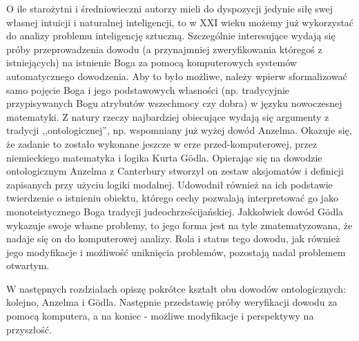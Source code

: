 \documentclass{eiti-raport}
\begin{document}
O ile starożytni i średniowieczni autorzy mieli do dyspozycji jedynie siłę swej własnej intuicji i naturalnej inteligencji, to w XXI wieku możemy już wykorzystać do analizy problemu inteligencję sztuczną. Szczególnie interesujące wydają się próby przeprowadzenia dowodu (a przynajmniej zweryfikowania któregoś z istniejących) na istnienie Boga za pomocą komputerowych systemów automatycznego dowodzenia. Aby to było możliwe, należy wpierw sformalizować samo pojęcie Boga i jego podstawowych własności (np. tradycyjnie przypisywanych Bogu atrybutów wszechmocy czy dobra) w języku nowoczesnej matematyki. Z natury rzeczy najbardziej obiecujące wydają się argumenty z tradycji ,,ontologicznej'', np. wspomniany już wyżej dowód Anzelma. Okazuje się, że zadanie to zostało wykonane jeszcze w erze przed-komputerowej, przez niemieckiego matematyka i logika Kurta G\"odla. Opierając się na dowodzie ontologicznym Anzelma z Canterbury stworzył on zestaw aksjomatów i definicji zapisanych przy użyciu logiki modalnej. Udowodnił również na ich podstawie twierdzenie o istnieniu obiektu, którego cechy pozwalają interpretować go jako monoteistycznego Boga tradycji judeochrześcijańskiej. Jakkolwiek dowód G\"odla wykazuje swoje własne problemy, to jego forma jest na tyle zmatematyzowana, że nadaje się on do komputerowej analizy. Rola i status tego dowodu, jak również jego modyfikacje i możliwość uniknięcia problemów, pozostają nadal problemem otwartym. 

W następnych rozdziałach opiszę pokrótce kształt obu dowodów ontologicznych: kolejno, Anzelma i G\"odla. Następnie przedstawię próby weryfikacji dowodu za pomocą komputera, a na koniec - możliwe modyfikacje i perspektywy na przyszłość. 
\end{document}

